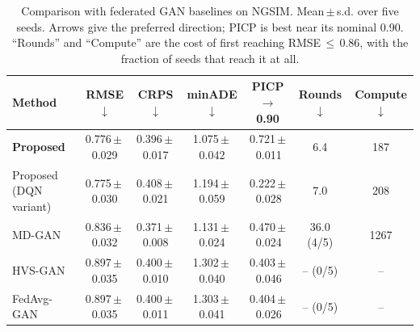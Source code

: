 \begin{table}[!t]
\centering
\caption{Comparison with federated GAN baselines on NGSIM. Mean\,$\pm$\,s.d. over five seeds. Arrows give the preferred direction; PICP is best near its nominal 0.90. ``Rounds'' and ``Compute'' are the cost of first reaching RMSE\,$\leq$\,0.86, with the fraction of seeds that reach it at all.}
\label{tab:sota}
\begin{tabular}{lcccccc}
\toprule
Method & RMSE $\downarrow$ & CRPS $\downarrow$ & minADE $\downarrow$ & PICP $\rightarrow$0.90 & Rounds $\downarrow$ & Compute $\downarrow$ \\
\midrule
\textbf{Proposed} & 0.776\,$\pm$\,0.029 & 0.396\,$\pm$\,0.017 & 1.075\,$\pm$\,0.042 & 0.721\,$\pm$\,0.011 & 6.4 & 187 \\
Proposed (DQN variant) & 0.775\,$\pm$\,0.030 & 0.408\,$\pm$\,0.021 & 1.194\,$\pm$\,0.059 & 0.222\,$\pm$\,0.028 & 7.0 & 208 \\
MD-GAN \cite{hardy2019mdgan} & 0.836\,$\pm$\,0.032 & 0.371\,$\pm$\,0.008 & 1.131\,$\pm$\,0.024 & 0.470\,$\pm$\,0.024 & 36.0 (4/5) & 1267 \\
HVS-GAN \cite{wu2024hvsgan} & 0.897\,$\pm$\,0.035 & 0.400\,$\pm$\,0.010 & 1.302\,$\pm$\,0.040 & 0.403\,$\pm$\,0.046 & -- (0/5) & -- \\
FedAvg-GAN & 0.897\,$\pm$\,0.035 & 0.400\,$\pm$\,0.011 & 1.303\,$\pm$\,0.041 & 0.404\,$\pm$\,0.026 & -- (0/5) & -- \\
\bottomrule
\end{tabular}
\end{table}
